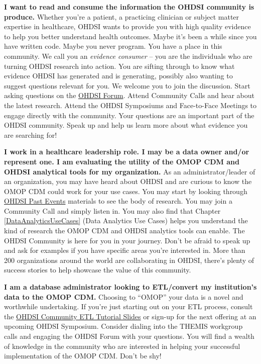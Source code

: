 \documentclass[11pt]{book}
\theoremstyle{definition}
\theoremstyle{definition}
\theoremstyle{definition}
\theoremstyle{remark}
\begin{document}
\textbf{I want to read and consume the information the OHDSI community
is produce.} Whether you're a patient, a practicing clinician or subject
matter expertise in healthcare, OHDSI wants to provide you with high
quality evidence to help you better understand health outcomes. Maybe
it's been a while since you have written code. Maybe you never program.
You have a place in this community. We call you an \emph{evidence
consumer} -- you are the individuals who are turning OHDSI research into
action. You are sifting through to know what evidence OHDSI has
generated and is generating, possibly also wanting to suggest questions
relevant for you. We welcome you to join the discussion. Start asking
questions on the \href{http://forum.ohdsi.org}{OHDSI Forum}. Attend
Community Calls and hear about the latest research. Attend the OHDSI
Symposiums and Face-to-Face Meetings to engage directly with the
community. Your questions are an important part of the OHDSI community.
Speak up and help us learn more about what evidence you are searching
for!

\textbf{I work in a healthcare leadership role. I may be a data owner
and/or represent one. I am evaluating the utility of the OMOP CDM and
OHDSI analytical tools for my organization.} As an administrator/leader
of an organization, you may have heard about OHDSI and are curious to
know the OMOP CDM could work for your use cases. You may start by
looking through \href{https://www.ohdsi.org/past-events/}{OHDSI Past
Events} materials to see the body of research. You may join a Community
Call and simply listen in. You may also find that Chapter
\ref{DataAnalyticsUseCases} (Data Analytics Use Cases) helps you
understand the kind of research the OMOP CDM and OHDSI analytics tools
can enable. The OHDSI Community is here for you in your journey. Don't
be afraid to speak up and ask for examples if you have specific areas
you're interested in. More than 200 organizations around the world are
collaborating in OHDSI, there's plenty of success stories to help
showcase the value of this community.

\textbf{I am a database administrator looking to ETL/convert my
institution's data to the OMOP CDM.} Choosing to ``OMOP'' your data is a
novel and worthwhile undertaking. If you're just starting out on your
ETL process, consult the
\href{https://www.ohdsi-europe.org/images/symposium-2019/tutorials/OHDSI_Vocabulary_CDM_Tutorial.pdf}{OHDSI
Community ETL Tutorial Slides} or sign-up for the next offering at an
upcoming OHDSI Symposium. Consider dialing into the THEMIS workgroup
calls and engaging the OHDSI Forum with your questions. You will find a
wealth of knowledge in the community who are interested in helping your
successful implementation of the OMOP CDM. Don't be shy!
\end{document}
